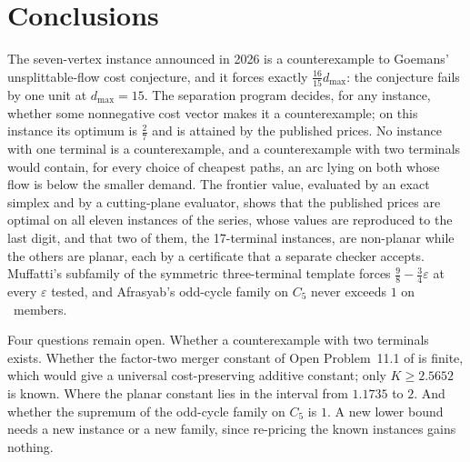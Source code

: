\documentclass[11pt]{article}
\theoremstyle{remark}
\newcommand{\dmax}{d_{\max}}
\begin{document}



\section{Conclusions}
\label{sec:conclusions}

The seven-vertex instance announced in 2026 is a counterexample to Goemans' unsplittable-flow cost conjecture, and it forces exactly $\tfrac{16}{15}\dmax$: the conjecture fails by one unit at $\dmax=15$. The separation program decides, for any instance, whether some nonnegative cost vector makes it a counterexample; on this instance its optimum is $\tfrac27$ and is attained by the published prices. No instance with one terminal is a counterexample, and a counterexample with two terminals would contain, for every choice of cheapest paths, an arc lying on both whose flow is below the smaller demand. The frontier value, evaluated by an exact simplex and by a cutting-plane evaluator, shows that the published prices are optimal on all eleven instances of the series, whose values are reproduced to the last digit, and that two of them, the 17-terminal instances, are non-planar while the others are planar, each by a certificate that a separate checker accepts.
Muffatti's subfamily of the symmetric three-terminal template forces $\tfrac98-\tfrac34\varepsilon$ at every $\varepsilon$ tested, and Afrasyab's odd-cycle family on $C_5$ never exceeds $1$ on \nsixtotal\ members.

Four questions remain open. Whether a counterexample with two terminals exists. Whether the factor-two merger constant of Open Problem~11.1 of \cite{Nik3} is finite, which would give a universal cost-preserving additive constant; only $K\ge2.5652$ is known. Where the planar constant lies in the interval from $1.1735$ to $2$. And whether the supremum of the odd-cycle family on $C_5$ is $1$. A new lower bound needs a new instance or a new family, since re-pricing the known instances gains nothing.
\end{document}

